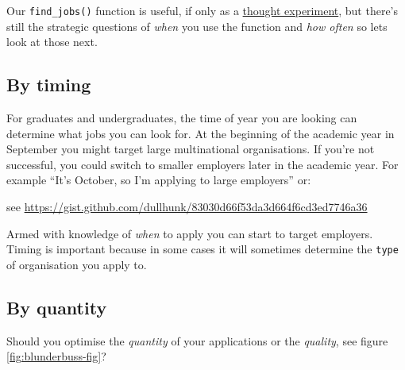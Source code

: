 \documentclass[
]{book}
\begin{document}
Our \texttt{find\_jobs()} function is useful, if only as a \href{https://en.wikipedia.org/wiki/Thought_experiment}{thought experiment}, but there's still the strategic questions of \emph{when} you use the function and \emph{how often} so lets look at those next.

\hypertarget{by-time}{%
\subsection{By timing}\label{by-time}}

For graduates and undergraduates, the time of year you are looking can determine what jobs you can look for. At the beginning of the academic year in September you might target large multinational organisations. If you're not successful, you could switch to smaller employers later in the academic year. For example ``It's October, so I'm applying to large employers'' or:

see \url{https://gist.github.com/dullhunk/83030d66f53da3d664f6cd3ed7746a36}

Armed with knowledge of \emph{when} to apply you can start to target employers. Timing is important because in some cases it will sometimes determine the \texttt{type} of organisation you apply to.

\hypertarget{by-quantity}{%
\subsection{By quantity}\label{by-quantity}}

Should you optimise the \emph{quantity} of your applications or the \emph{quality}, see figure \ref{fig:blunderbuss-fig}?
\end{document}
